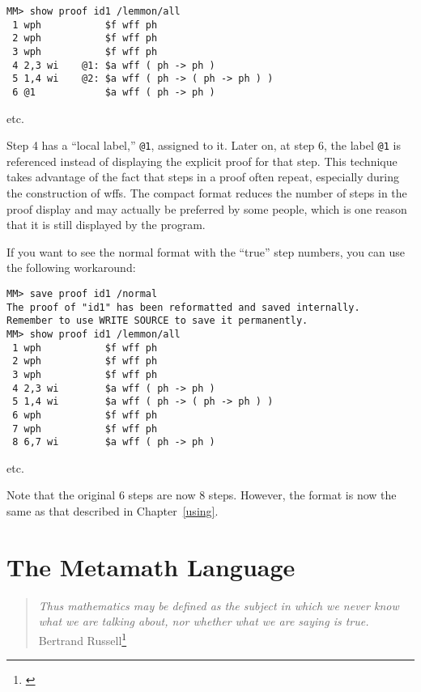\begin{verbatim}
MM> show proof id1 /lemmon/all
 1 wph           $f wff ph
 2 wph           $f wff ph
 3 wph           $f wff ph
 4 2,3 wi    @1: $a wff ( ph -> ph )
 5 1,4 wi    @2: $a wff ( ph -> ( ph -> ph ) )
 6 @1            $a wff ( ph -> ph )
\end{verbatim}

\begin{center}
{etc.}
\end{center}

Step 4 has a ``local label,'' \texttt{@1}, assigned to it.
Later on, at step 6, the label \texttt{@1} is referenced instead of
displaying the explicit proof for that step.  This technique takes advantage
of the fact that steps in a proof often repeat, especially during the
construction of wffs.  The compact format reduces the number of steps in the
proof display and may actually be preferred by some people, which is one
reason that it is still displayed by the program.

If you want to see the normal format with the ``true'' step numbers, you can
use the following workaround:

\begin{verbatim}
MM> save proof id1 /normal
The proof of "id1" has been reformatted and saved internally.
Remember to use WRITE SOURCE to save it permanently.
MM> show proof id1 /lemmon/all
 1 wph           $f wff ph
 2 wph           $f wff ph
 3 wph           $f wff ph
 4 2,3 wi        $a wff ( ph -> ph )
 5 1,4 wi        $a wff ( ph -> ( ph -> ph ) )
 6 wph           $f wff ph
 7 wph           $f wff ph
 8 6,7 wi        $a wff ( ph -> ph )
\end{verbatim}

\begin{center}
{etc.}
\end{center}

Note that the original 6 steps are now 8 steps.  However, the format is
now the same as that described in Chapter~\ref{using}.

\chapter{The Metamath Language}
\label{languagespec}

\begin{quote}
  {\em Thus mathematics may be defined as the subject in which we never know
what we are talking about, nor whether what we are saying is true.}
    \flushright\sc  Bertrand Russell\footnote{\cite[p.~84]{Russell2}}\\
\end{quote}

